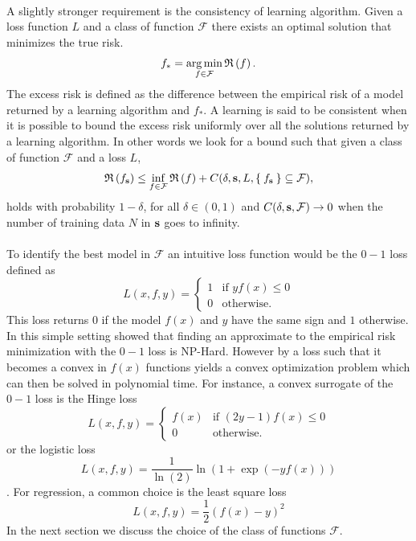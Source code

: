 \paragraph{}
A slightly stronger requirement is the consistency of learning algorithm.
Given a loss function $L$ and a class of function $\mathcal{F}$ there exists an
optimal solution that minimizes the true risk.
\begin{dmath*}
    f_* = \argmin_{f\in\mathcal{F}} \risk{f}.
\end{dmath*}
The excess risk is defined as the difference between the empirical risk of a
model returned by a learning algorithm and $f_*$. A learning is said to be
consistent when it is possible to bound the excess risk uniformly over all
the solutions returned by a learning algorithm. In other words we look for a
bound such that given a class of function $\mathcal{F}$ and a loss $L$,
\begin{dmath*}
    \risk{f_{\seq{s}}} \le \inf_{f\in\mathcal{F}} \risk{f} + C(\delta, \seq{s},
    L, \Set{f_{\seq{s}}}\subseteq\mathcal{F}),
\end{dmath*}
holds with probability $1 - \delta$, for all $\delta \in (0, 1)$  and
$C(\delta, \boldsymbol{\mathbf{s}}, \mathcal{F}) \to 0$ when the number of training data $N$ in
$\boldsymbol{\mathbf{s}}$ goes to infinity. 
\paragraph{}
To identify the best model in $\mathcal{F}$ an intuitive loss function would be
the $0-1$ loss defined as
\begin{dmath*}
    L(x, f, y) =
    \begin{cases}
        1 & \text{if } yf(x) \le 0 \\
        0 & \text{otherwise}.
    \end{cases}
\end{dmath*}
This loss returns $0$ if the model $f(x)$ and $y$ have the same sign and $1$
otherwise. In this simple setting \citet{hoffgen1995robust} showed that finding
an approximate to the empirical risk minimization with the $0-1$ loss is
NP-Hard. However by  a loss such that it becomes a convex in
$f(x)$ functions yields a convex optimization problem which can then be solved
in polynomial time. For instance, a convex surrogate of the $0-1$ loss is the
Hinge loss
\begin{dmath*}
    L(x, f, y) =
    \begin{cases}
        f(x) & \text{if } (2y-1)f(x) \le 0 \\
        0 & \text{otherwise}.
    \end{cases}
\end{dmath*}
or the logistic loss
\begin{dmath*}
    L(x, f, y) = \frac{1}{\ln(2)} \ln(1 + \exp(-yf(x)))
\end{dmath*}.
For regression, a common choice is the least square loss
\begin{dmath*}
    L(x, f, y) = \frac{1}{2}(f(x) - y)^2
\end{dmath*}
In the next section we discuss the choice of the class of functions
$\mathcal{F}$.

